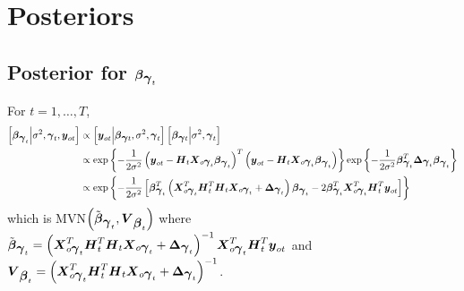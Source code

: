 \documentclass[fleqn]{article}
\def\bm#1{\mbox{\boldmath $#1$}}
\begin{document}
\section{Posteriors}
\subsection{Posterior for $\bm{\beta}_{\bm{\gamma}_t}$}
%
For $t = 1, \ldots, T$, 
%
\begin{align*}
%
\left[ \bm{\beta}_{\bm{\gamma}_t} \middle| \sigma^2, \bm{\gamma}_t, \bm{y}_{o t} \right] & \propto \left[ \bm{y}_{o t} \middle| \bm{\beta}_{\bm{\gamma} t}, \sigma^2, \bm{\gamma}_t \right] \left[ \bm{\beta}_{\bm{\gamma} t} \middle| \sigma^2, \bm{\gamma}_t \right] \\
%
& \propto \exp{ \left\{ - \frac{1} {2 \sigma^2} \left( \bm{y}_{o t} - \bm{H}_t \bm{X}_{o \bm{\gamma}_t} \bm{\beta}_{\bm{\gamma}_t} \right)^T \left( \bm{y}_{o t} - \bm{H}_t \bm{X}_{o \bm{\gamma}_t} \bm{\beta}_{\bm{\gamma}_t} \right) \right\} } \exp{ \left\{ - \frac{1} {2 \sigma^2} \bm{\beta}_{\bm{\gamma}_t}^T \bm{\Delta}_{\bm{\gamma}_t} \bm{\beta}_{\bm{\gamma}_t} \right\} } \\
%
& \propto \exp{ \left\{ - \frac{1} {2 \sigma^2} \left[ \bm{\beta}_{\bm{\gamma}_t}^T \left( \bm{X}_{o \bm{\gamma}_t}^T \bm{H}_t^T \bm{H}_t \bm{X}_{o \bm{\gamma}_t} + \bm{\Delta}_{\bm{\gamma}_t} \right) \bm{\beta}_{\bm{\gamma}_t} - 2 \bm{\beta}_{\bm{\gamma}_t}^T \bm{X}_{o \bm{\gamma}_t}^T \bm{H}_t^T \bm{y}_{o t} \right] \right\} } \\
%
\end{align*}
%
which is MVN$\left( \tilde{\bm{\beta}}_{\bm{\gamma}_t}, \bm{V}_{\bm{\beta}_t} \right)$ where $\tilde{\bm{\beta}}_{\bm{\gamma}_t} = \left( \bm{X}_{o \bm{\gamma}_t}^T \bm{H}_t^T \bm{H}_t \bm{X}_{o \bm{\gamma}_t} + \bm{\Delta}_{\bm{\gamma}_t} \right)^{ - 1}\bm{X}_{o \bm{\gamma}_t}^T \bm{H}_t^T \bm{y}_{o t}$ and $\bm{V}_{\bm{\beta}_t} = \left( \bm{X}_{o \bm{\gamma}_t}^T \bm{H}_t^T \bm{H}_t \bm{X}_{o \bm{\gamma}_t} + \bm{\Delta}_{\bm{\gamma}_t} \right)^{ - 1}$.
\end{document}
